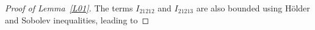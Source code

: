 \documentclass[10pt,reqno]{amsart}
\theoremstyle{plain}
\theoremstyle{definition}
\numberwithin{equation}{section}
\newcommand{\ccP}{\mathscr{P}}
\newcommand{\Ga}{\Gamma}
\newcommand{\si}{\sigma}
\begin{document}
\begin{proof}[Proof of Lemma~\ref{L01}]
The terms $I_{21212}$ and $I_{21213}$ are also bounded using
H\"older and Sobolev inequalities, leading to


\end{proof}
\end{document}
